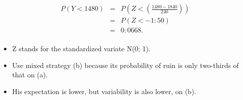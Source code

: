 \documentclass[a4paper,12pt]{article}
\begin{document}
\begin{enumerate}[(a)]
\begin{eqnarray*}
P(Y < 1480) &=& P\left(Z < \left( \frac{1480-1840}{240} \right)
\right) \\
&=& P(Z < -1:50)\\ 
&=& 0:0668.\\
\end{eqnarray*}

\begin{itemize}
    \item Z stands for the standardized variate N(0; 1).
    \item Use mixed strategy (b) because
its probability of ruin is only two-thirds of that on (a).
\item His expectation
is lower, but variability is also lower, on (b).
\end{itemize}

\end{enumerate}
\end{document}
